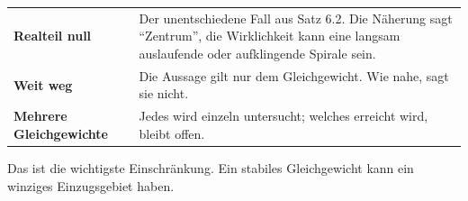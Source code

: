 \begin{warnung}
\begin{center}
{\small
\renewcommand{\arraystretch}{1.52}
\begin{tabular}{@{}P{2.6cm}P{6.0cm}@{}}
\toprule
\textbf{Realteil null} & Der unentschiedene Fall aus Satz 6.2. Die Näherung sagt \enquote{Zentrum}, die Wirklichkeit kann eine langsam auslaufende oder aufklingende Spirale sein.\\
\textbf{Weit weg} & Die Aussage gilt nur  dem Gleichgewicht. Wie nahe, sagt sie nicht.\\
\textbf{Mehrere Gleichgewichte} & Jedes wird einzeln untersucht; welches erreicht wird, bleibt offen.\\
\bottomrule
\end{tabular}}
\end{center}

Das ist die wichtigste Einschränkung. Ein stabiles Gleichgewicht kann ein winziges Einzugsgebiet haben.

\begin{center}
\begin{minipage}{0.88\textwidth}
\end{minipage}
\end{center}
\end{warnung}

